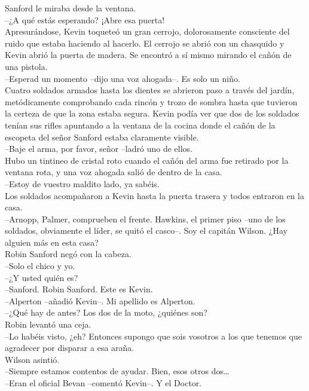 Sanford le miraba desde la ventana.\\
--¿A qué estás esperando? ¡Abre esa puerta!\\
Apresurándose, Kevin toqueteó un gran cerrojo, dolorosamente consciente
del ruido que estaba haciendo al hacerlo. El cerrojo se abrió con un
chasquido y Kevin abrió la puerta de madera. Se encontró a sí mismo
mirando el cañón de una pistola.\\
--Esperad un momento --dijo una voz ahogada--. Es solo un niño.\\
Cuatro soldados armados hasta los dientes se abrieron paso a través del
jardín, metódicamente comprobando cada rincón y trozo de sombra hasta
que tuvieron la certeza de que la zona estaba segura. Kevin podía ver
que dos de los soldados tenían sus rifles apuntando a la ventana de la
cocina donde el cañón de la escopeta del señor Sanford estaba claramente
visible.\\
--Baje el arma, por favor, señor --ladró uno de ellos.\\
Hubo un tintineo de cristal roto cuando el cañón del arma fue retirado
por la ventana rota, y una voz ahogada salió de dentro de la casa.\\
--Estoy de vuestro maldito lado, ya sabéis.\\
Los soldados acompañaron a Kevin hasta la puerta trasera y todos
entraron en la casa.\\
--Arnopp, Palmer, comprueben el frente. Hawkins, el primer piso --uno de
los soldados, obviamente el líder, se quitó el casco--. Soy el capitán
Wilson. ¿Hay alguien más en esta casa?\\
Robin Sanford negó con la cabeza.\\
--Solo el chico y yo.\\
--¿Y usted quién es?\\
--Sanford. Robin Sanford. Este es Kevin.\\
--Alperton --añadió Kevin--. Mi apellido es Alperton.\\
--¿Qué hay de antes? Los dos de la moto, ¿quiénes son?\\
Robin levantó una ceja.\\
--Lo habéis visto, ¿eh? Entonces supongo que sois vosotros a los que
tenemos que agradecer por disparar a esa araña.\\
Wilson asintió.\\
--Siempre estamos contentos de ayudar. Bien, esos otros dos\ldots{}\\
--Eran el oficial Bevan --comentó Kevin--. Y el Doctor.\\
